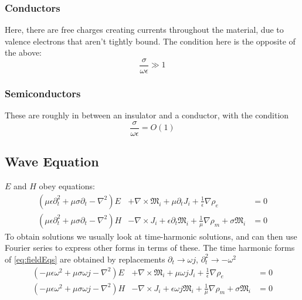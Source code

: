 \documentclass{article}
\begin{document}
\subsubsection{Conductors}
Here, there are free charges creating currents throughout the material, due to valence electrons that aren't tightly bound. The condition here is the opposite of the above:
    \begin{equation} \label{eq:conductor}
        \frac{\sigma}{\omega \epsilon} \gg 1
    \end{equation}
\subsubsection{Semiconductors}
These are roughly in between an insulator and a conductor, with the condition
    \begin{equation} \label{eq:semiconductor}
        \frac{\sigma}{\omega \epsilon} = O(1)
    \end{equation}
\newpage
\subsection{Wave Equation}
$E$ and $H$ obey equations:
\begin{subequations} \label{eq:fieldEqs}
    \begin{align}
    (\mu \epsilon \partial^2_t + \mu \sigma \partial_t - \nabla^2 ) E & + \nabla \times \mathfrak{M}_i + \mu \partial_t J_i + \frac{1}{\epsilon} \nabla \rho_e &= 0 \label{eq:electricFieldEq} \\
    (\mu \epsilon \partial^2_t + \mu \sigma \partial_t - \nabla^2 ) H & - \nabla \times J_i + \epsilon \partial_t \mathfrak{M}_i + \frac{1}{\mu} \nabla \rho_m + \sigma \mathfrak{M}_i &= 0 \label{eq:magneticFieldEq}
    \end{align}
\end{subequations}
To obtain solutions we usually look at time-harmonic solutions, and can then use Fourier series to express other forms in terms of these. The time harmonic forms of \eqref{eq:fieldEqs} are obtained by replacements $\partial_t \to \omega j$, $\partial_t^2 \to - \omega^2$
\begin{subequations} \label{eq:fieldEqsTH}
    \begin{align}
    (- \mu \epsilon \omega^2 + \mu \sigma \omega j - \nabla^2 ) E & + \nabla \times \mathfrak{M}_i + \mu \omega j J_i + \frac{1}{\epsilon} \nabla \rho_e &= 0 \label{eq:electricFieldEqTH} \\
    ( - \mu \epsilon \omega^2 + \mu \sigma \omega j - \nabla^2 ) H & - \nabla \times J_i + \epsilon \omega j \mathfrak{M}_i + \frac{1}{\mu} \nabla \rho_m + \sigma \mathfrak{M}_i &= 0 \label{eq:magneticFieldEqTH}
    \end{align}
\end{subequations}
\end{document}
